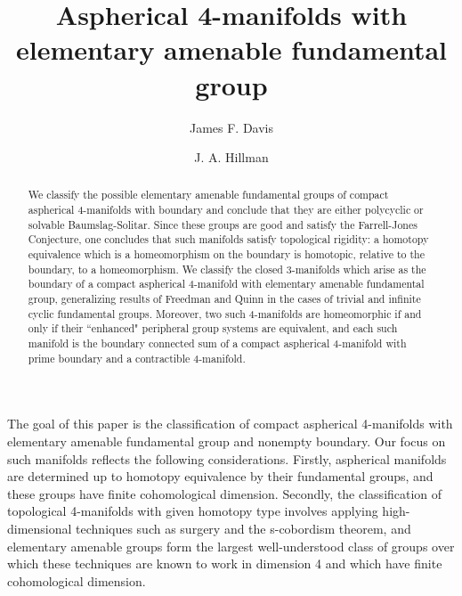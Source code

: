 \documentclass[12pt]{amsart}
\theoremstyle{definition}
\begin{document}
\title[Aspherical 4-manifolds]{Aspherical 4-manifolds with elementary
amenable fundamental group}

\author{James F.  Davis \and J. A. Hillman }
\address{{Department of Mathematics, Indiana University,}
\newline
{Bloomington, IN 47405 USA} 
\newline
{School of Mathematics and Statistics, University of Sydney,}
\newline
Sydney,  NSW 2006, Australia }


\begin{abstract}
We classify the possible elementary amenable fundamental groups of compact aspherical  4-manifolds 
with boundary   and conclude that they are either polycyclic 
or solvable Baumslag-Solitar.    Since these groups are good and satisfy the Farrell-Jones Conjecture, one concludes that such manifolds satisfy topological rigidity: a homotopy equivalence which is a homeomorphism on the boundary is homotopic, relative to the boundary, to a homeomorphism.  We classify the closed 3-manifolds which arise as the boundary of a compact aspherical 4-manifold with elementary amenable fundamental group, generalizing results of Freedman and Quinn in the cases of trivial and infinite cyclic fundamental groups.
Moreover, two such 4-manifolds are homeomorphic if and only if 
their ``enhanced" peripheral group systems are equivalent,
and each such manifold is the boundary connected sum of a compact
aspherical 4-manifold with prime boundary and a
contractible 4-manifold. 

\end{abstract}



\maketitle

The goal of this paper is the classification of compact aspherical 4-manifolds 
with elementary amenable fundamental group and nonempty boundary.
Our focus on such manifolds reflects the following considerations.
Firstly,  aspherical manifolds are determined up to homotopy equivalence 
by their fundamental groups, and these groups have finite cohomological dimension.
Secondly, the classification of topological 4-manifolds with given homotopy type 
involves applying high-dimensional techniques such as surgery and the s-cobordism theorem, and elementary amenable groups form the largest well-understood class of 
groups over which these techniques are known to work in dimension 4
and which have finite cohomological dimension.
\end{document}
